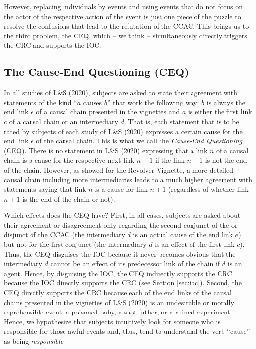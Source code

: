 \documentclass[egregdoesnotlikesansseriftitles,12pt]{scrartcl}
\begin{document}
However, replacing individuals by events and using events that do not focus on the actor of the respective action of the event is just one piece of the puzzle to resolve the confusions that lead to the refutation of the CCAC. This brings us to the third problem, the CEQ, which -- we think -- simultaneously directly triggers the CRC and supports the IOC.

\subsection{The Cause-End Questioning (CEQ) }\label{sec:ceq}
In all studies of L\&S (2020), subjects are asked to state their agreement with statements of the kind ``$a$ causes $b$'' that work the following way: $b$ is always the end link $e$ of a causal chain presented in the vignettes and $a$ is either the first link $c$ of a causal chain or an intermediary $d$. That is, each statement that is to be rated by subjects of each study of L\&S (2020) expresses a certain cause for the end link $e$ of the causal chain. This is what we call the \textit{Cause-End Questioning} (CEQ). There is no statement in L\&S (2020) expressing that a link $n$ of a causal chain is a cause for the respective next link $n+1$ if the link $n+1$ is not the end of the chain. However, as \citet{bauer_answers_2022} showed for the Revolver Vignette, a more detailed causal chain including more intermediaries leads to a much higher agreement with statements saying that link $n$ is a cause for link $n+1$ (regardless of whether link $n+1$ is the end of the chain or not).

Which effects does the CEQ have? First, in all cases, subjects are asked about their agreement or disagreement only regarding the second conjunct of the or-disjunct of the CCAC (the intermediary $d$ is an actual cause of the end link $e$) but not for the first conjunct (the intermediary $d$ is an effect of the first link $c$). Thus, the CEQ disguises the IOC because it never becomes obvious that the intermediary $d$ cannot be an effect of its predecessor link of the chain if $d$ is an agent. Hence, by disguising the IOC, the CEQ indirectly supports the CRC because the IOC directly supports the CRC (see Section \ref{sec:ioc}). Second, the CEQ directly supports the CRC because each of the end links of the causal chains presented in the vignettes of L\&S (2020) is an undesirable or morally reprehensible event: a poisoned baby, a shot father, or a ruined experiment. Hence, we hypothesize that subjects intuitively look for someone who is responsible for those awful events and, thus, tend to understand the verb ``cause'' as being \textit{responsible}.
\end{document}
